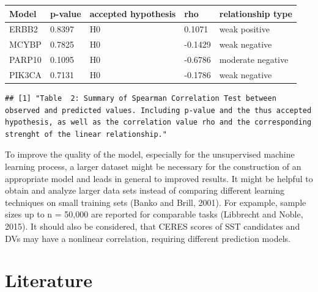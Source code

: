 \documentclass[]{article}
\begin{document}
\begin{longtable}[]{@{}lllll@{}}
\toprule
Model & p-value & accepted hypothesis & rho & relationship
type\tabularnewline
\midrule
\endhead
ERBB2 & 0.8397 & H0 & 0.1071 & weak positive\tabularnewline
MCYBP & 0.7825 & H0 & -0.1429 & weak negative\tabularnewline
PARP10 & 0.1095 & H0 & -0.6786 & moderate negative\tabularnewline
PIK3CA & 0.7131 & H0 & -0.1786 & weak negative\tabularnewline
\bottomrule
\end{longtable}

\begin{verbatim}
## [1] "Table  2: Summary of Spearman Correlation Test between observed and predicted values. Including p-value and the thus accepted hypothesis, as well as the correlation value rho and the corresponding strenght of the linear relationship."
\end{verbatim}

To improve the quality of the model, especially for the unsupervised
machine learning process, a larger dataset might be necessary for the
construction of an appropriate model and leads in general to improved
results. It might be helpful to obtain and analyze larger data sets
instead of comparing different learning techniques on small training
sets (Banko and Brill, 2001). For expample, sample sizes up to n =
50,000 are reported for comparable tasks (Libbrecht and Noble, 2015). It
should also be considered, that CERES scores of SST candidates and DVs
may have a nonlinear correlation, requiring different prediction models.

\hypertarget{literature}{%
\section{Literature}\label{literature}}
\end{document}
